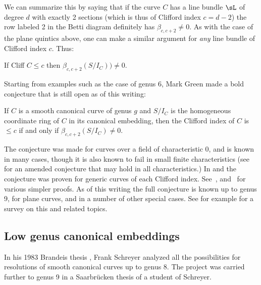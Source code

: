 We can summarize this by saying
that if the curve $C$ has a line bundle $\sL$ of degree $d$ with exactly 2 sections (which is thus of Clifford index $c = d-2$) the row labeled  2 
in the Betti diagram definitely has $\beta_{c, c+2} \neq 0$. As with the case of the plane quintics above, one can
make a similar argument for \emph{any} line bundle of Clifford index $c$. Thus:

\begin{corollary}
 If Cliff $C \leq c$ then $\beta_{c,c+2}(S/I_C)) \neq 0.$
\end{corollary}
 
Starting from examples such as the case of genus 6, Mark Green made a bold conjecture that is still open as of this writing:

\begin{conjecture}
If $C$ is a smooth canonical curve of genus $g$ and $S/I_C$ is the homogeneous coordinate ring of $C$ in its canonical embedding,
then the Clifford index of $C$ is $\leq c$ if and only if $\beta_{c,c+2}(S/I_C) \neq 0$. 
\end{conjecture}

The conjecture was made for curves over a field of characteristic 0, and is known in many cases, though it is also known to fail in small finite characteristics (see~\cite{Bopp-Schreyer} for an amended conjecture that may hold in all characteristics.)
In \cite{MR1941089} and \cite{MR2157134} the conjecture was proven for generic curves of each Clifford index.  See~\cite{MR4022070}, \cite{MR4213770} and~\cite{arXiv:2205.00266}  for various simpler proofs.  As of this writing the full conjecture is known up to genus 9,  for plane curves, and in a number of other special cases.
See for example \cite{Farkas-progress-on-syzygies} for a survey on this and related topics.

\subsection{Low genus canonical embeddings} 
In his 1983 Brandeis thesis \cite{Schreyer-canonical}, Frank Schreyer analyzed all the possibilities for resolutions of smooth canonical curves up to genus 8. The project was carried further to genus 9 in a Saarbr\"ucken thesis \cite{Sagraloff}  of a student of Schreyer.



%
%

